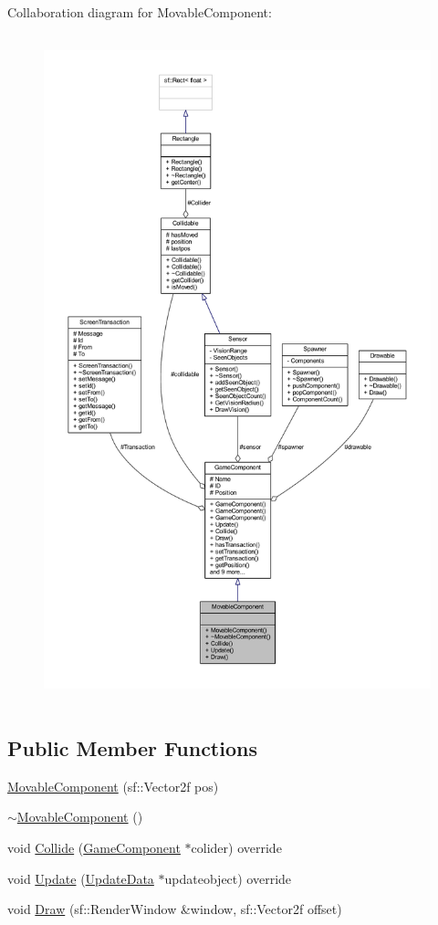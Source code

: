 Collaboration diagram for Movable\-Component\-:
\nopagebreak
\begin{figure}[H]
\begin{center}
\leavevmode
\includegraphics[height=550pt]{class_movable_component__coll__graph}
\end{center}
\end{figure}
\subsection*{Public Member Functions}
\begin{DoxyCompactItemize}
\item 
\hyperlink{class_movable_component_aea0453392e1d269a4b4c207728a3ddaf}{Movable\-Component} (sf\-::\-Vector2f pos)
\item 
\hyperlink{class_movable_component_aedc5ac024682262c99436b2b5fadddc1}{$\sim$\-Movable\-Component} ()
\item 
void \hyperlink{class_movable_component_a5ab32fd53c29a29ddcd68f1bb38a5f2b}{Collide} (\hyperlink{class_game_component}{Game\-Component} $\ast$colider) override
\item 
void \hyperlink{class_movable_component_a6310c2306c503472873721a9756003a8}{Update} (\hyperlink{class_update_data}{Update\-Data} $\ast$updateobject) override
\item 
void \hyperlink{class_movable_component_a75c4dad8db642791c52d7fc5e9a92429}{Draw} (sf\-::\-Render\-Window \&window, sf\-::\-Vector2f offset)
\end{DoxyCompactItemize}
